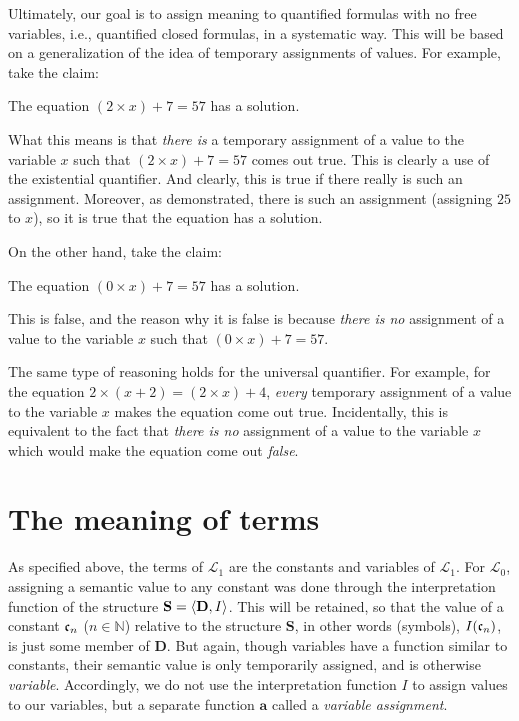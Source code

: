 Ultimately, our goal is to assign meaning to quantified formulas with no free variables, i.e., quantified closed formulas, in a systematic way. This will be based on a generalization of the idea of temporary assignments of values. For example, take the claim:
\begin{center}
	The equation $(2\times x)+7=57$ has a solution. 
\end{center}
What this means is that \textit{there is} a temporary assignment of a value to the variable $x$ such that $(2\times x)+7=57$ comes out true. This is clearly a use of the existential quantifier. And clearly, this is true if there really is such an assignment. Moreover, as demonstrated, there is such an assignment (assigning $25$ to $x$), so it is true that the equation has a solution. 

On the other hand, take the claim: 
\begin{center}
	The equation $(0\times x)+7=57$ has a solution. 
\end{center}
This is false, and the reason why it is false is because \textit{there is no} assignment of a value to the variable $x$ such that $(0\times x)+7=57$. 

The same type of reasoning holds for the universal quantifier. For example, for the equation $2 \times (x + 2)=(2 \times x) + 4$, \textit{every} temporary assignment of a value to the variable $x$ makes the equation come out true. Incidentally, this is equivalent to the fact that \textit{there is no} assignment of a value to the variable $x$ which would make the equation come out \textit{false}. 

\section{The meaning of terms}

As specified above, the terms of $\mathcal{L}_1$ are the constants and variables of $\mathcal{L}_1$. For $\mathcal{L}_0$, assigning a semantic value to any constant was done through the interpretation function of the structure $\mathbf{S}=\langle\mathbf{D}, I\rangle$. This will be retained, so that the value of a constant $\mathfrak{c}_{n}$ ($n \in \mathbb{N}$) relative to the structure $\mathbf{S}$, in other words (symbols), $I(\mathfrak{c}_{n})$, is just some member of $\mathbf{D}$. But again, though variables have a function similar to constants, their semantic value is only temporarily assigned, and is otherwise \textit{variable}. Accordingly, we do not use the interpretation function $I$ to assign values to our variables, but a separate function $\mathbf{a}$ called a \textit{variable assignment}. 

